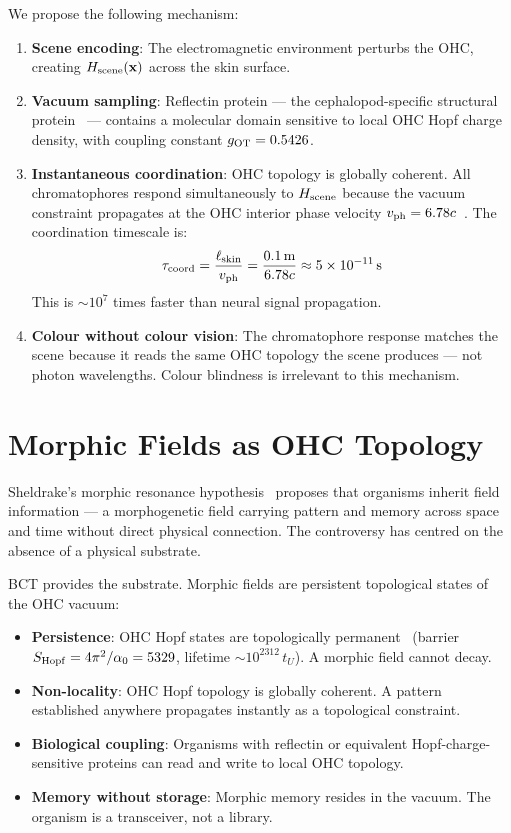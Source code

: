 \documentclass[twocolumn,10pt]{article}
\begin{document}
We propose the following mechanism:
\begin{enumerate}
\item \textbf{Scene encoding}: The electromagnetic environment perturbs the OHC,
creating $H_{\rm scene}(\mathbf{x})$ across the skin surface.
\item \textbf{Vacuum sampling}: Reflectin protein --- the cephalopod-specific structural
protein~\cite{kramer2007} --- contains a molecular domain sensitive to local OHC Hopf
charge density, with coupling constant $g_{\rm OT} = 0.5426$.
\item \textbf{Instantaneous coordination}: OHC topology is globally coherent. All
chromatophores respond simultaneously to $H_{\rm scene}$ because the vacuum
constraint propagates at the OHC interior phase velocity $v_{\rm ph} = 6.78c$~\cite{bct_jhapp}.
The coordination timescale is:
\begin{equation}
\tau_{\rm coord} = \frac{\ell_{\rm skin}}{v_{\rm ph}} 
= \frac{0.1\,{\rm m}}{6.78c} \approx 5\times10^{-11}\,{\rm s}
\end{equation}
This is $\sim 10^7$ times faster than neural signal propagation.
\item \textbf{Colour without colour vision}: The chromatophore response matches
the scene because it reads the same OHC topology the scene produces --- not photon
wavelengths. Colour blindness is irrelevant to this mechanism.
\end{enumerate}

\section{Morphic Fields as OHC Topology}

Sheldrake's morphic resonance hypothesis~\cite{sheldrake1981} proposes that organisms
inherit field information --- a morphogenetic field carrying pattern and memory across
space and time without direct physical connection. The controversy has centred on the
absence of a physical substrate.

BCT provides the substrate. Morphic fields are persistent topological states of the
OHC vacuum:
\begin{itemize}
\item \textbf{Persistence}: OHC Hopf states are topologically permanent~\cite{bct_l45}
  (barrier $S_{\rm Hopf} = 4\pi^2/\alpha_0 = 5329$, lifetime $\sim 10^{2312}\,t_U$).
  A morphic field cannot decay.
\item \textbf{Non-locality}: OHC Hopf topology is globally coherent.
  A pattern established anywhere propagates instantly as a topological constraint.
\item \textbf{Biological coupling}: Organisms with reflectin or equivalent
  Hopf-charge-sensitive proteins can read and write to local OHC topology.
\item \textbf{Memory without storage}: Morphic memory resides in the vacuum.
  The organism is a transceiver, not a library.
\end{itemize}
\end{document}
